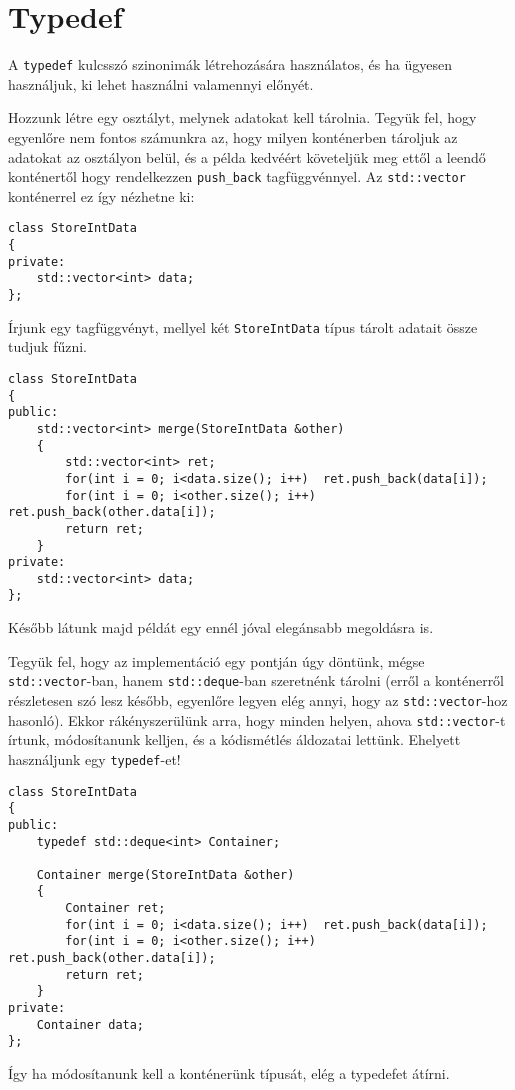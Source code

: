 \documentclass[a4paper,11.5pt,table]{article}
\begin{document}
	\section{Typedef}
	A \texttt{typedef} kulcsszó szinonimák létrehozására használatos, és ha ügyesen használjuk, ki lehet használni valamennyi előnyét. 
	
	\smallskip
	Hozzunk létre egy osztályt, melynek adatokat kell tárolnia. Tegyük fel, hogy egyenlőre nem fontos számunkra az, hogy milyen konténerben tároljuk az adatokat az osztályon belül, és a példa kedvéért követeljük meg ettől a leendő konténertől hogy rendelkezzen \texttt{push\_back} tagfüggvénnyel. Az \texttt{std::vector} konténerrel ez így nézhetne ki:
	\begin{lstlisting}
class StoreIntData
{
private:
	std::vector<int> data;
};
	\end{lstlisting}
	Írjunk egy tagfüggvényt, mellyel két \texttt{StoreIntData} típus tárolt adatait össze tudjuk fűzni.
	\begin{lstlisting}
class StoreIntData
{
public:
	std::vector<int> merge(StoreIntData &other)
	{
		std::vector<int> ret;
		for(int i = 0; i<data.size(); i++)  ret.push_back(data[i]);
		for(int i = 0; i<other.size(); i++) ret.push_back(other.data[i]);
		return ret;
	}
private:
	std::vector<int> data;
};
	\end{lstlisting}
	\begin{note}
		Később látunk majd példát egy ennél jóval elegánsabb megoldásra is.
	\end{note}
	Tegyük fel, hogy az implementáció egy pontján úgy döntünk, mégse \texttt{std::vector}-ban, hanem \texttt{std::deque}-ban szeretnénk tárolni (erről a konténerről részletesen szó lesz később, egyenlőre legyen elég annyi, hogy az \texttt{std::vector}-hoz hasonló). Ekkor rákényszerülünk arra, hogy minden helyen, ahova \texttt{std::vector}-t írtunk, módosítanunk kelljen, és a kódismétlés áldozatai lettünk. Ehelyett használjunk egy \texttt{typedef}-et!
	\begin{lstlisting}
class StoreIntData
{
public:
	typedef std::deque<int> Container;
	
	Container merge(StoreIntData &other)
	{
		Container ret;
		for(int i = 0; i<data.size(); i++)  ret.push_back(data[i]);
		for(int i = 0; i<other.size(); i++) ret.push_back(other.data[i]);
		return ret;
	}
private:
	Container data;
};
	\end{lstlisting}
	Így ha módosítanunk kell a konténerünk típusát, elég a typedefet átírni.
	\medskip
	
\end{document}
